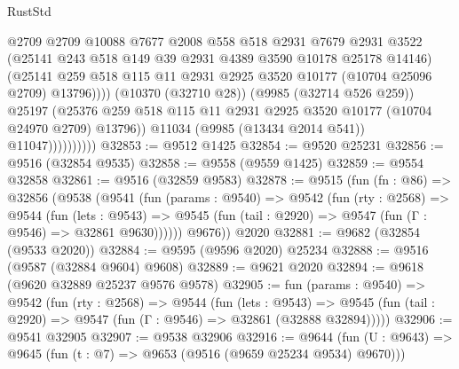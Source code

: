 \begin{lexlean}{RustStd}
\begin{coremodule}
                                @2709
                                @2709
                                @10088
                                @7677
                                @2008
                                @558
                                @518
                                @2931
                                @7679
                                @2931
                                @3522
                                (@25141 @243 @518 @149 @39 @2931 @4389 @3590 @10178 @25178 @14146)
                                (@25141
                                  @259
                                  @518
                                  @115
                                  @11
                                  @2931
                                  @2925
                                  @3520
                                  @10177
                                  (@10704 @25096 @2709)
                                  @13796))))
                          (@10370 (@32710 @28))
                          (@9985 (@32714 @526 @259))
                          @25197
                          (@25376
                            @259
                            @518
                            @115
                            @11
                            @2931
                            @2925
                            @3520
                            @10177
                            (@10704 @24970 @2709)
                            @13796))
                        @11034
                        (@9985 (@13434 @2014 @541))
                        @11047))))))))))
@32853 := @9512 @1425
@32854 := @9520 @25231
@32856 := @9516 (@32854 @9535)
@32858 := @9558 (@9559 @1425)
@32859 := @9554 @32858
@32861 := @9516 (@32859 @9583)
@32878 := @9515
    (fun (fn : @86) =>
    @32856
      (@9538
        (@9541
          (fun (params : @9540) =>
          @9542
            (fun (rty : @2568) =>
            @9544
              (fun (lets : @9543) =>
              @9545 (fun (tail : @2920) => @9547 (fun (Γ : @9546) => @32861 @9630))))))
        @9676))
    @2020
@32881 := @9682 (@32854 (@9533 @2020))
@32884 := @9595 (@9596 @2020) @25234
@32888 := @9516 (@9587 (@32884 @9604) @9608)
@32889 := @9621 @2020
@32894 := @9618 (@9620 @32889 @25237 @9576 @9578)
@32905 := fun (params : @9540) =>
  @9542
    (fun (rty : @2568) =>
    @9544
      (fun (lets : @9543) =>
      @9545 (fun (tail : @2920) => @9547 (fun (Γ : @9546) => @32861 (@32888 @32894)))))
@32906 := @9541 @32905
@32907 := @9538 @32906
@32916 := @9644
    (fun (U : @9643) => @9645 (fun (t : @7) => @9653 (@9516 (@9659 @25234 @9534) @9670)))

\end{coremodule}
\end{lexlean}

